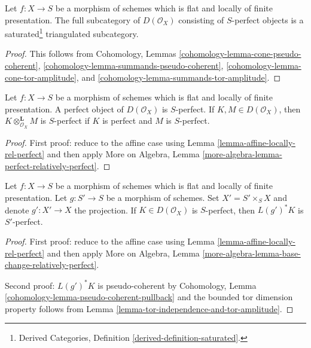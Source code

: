 \begin{lemma}
\label{lemma-triangulated}
Let $f : X \to S$ be a morphism of schemes which is
flat and locally of finite presentation. The full subcategory
of $D(\mathcal{O}_X)$ consisting of $S$-perfect objects is
a saturated\footnote{Derived Categories, Definition
\ref{derived-definition-saturated}.} triangulated subcategory.
\end{lemma}

\begin{proof}
This follows from Cohomology, Lemmas
\ref{cohomology-lemma-cone-pseudo-coherent},
\ref{cohomology-lemma-summands-pseudo-coherent},
\ref{cohomology-lemma-cone-tor-amplitude}, and
\ref{cohomology-lemma-summands-tor-amplitude}.
\end{proof}

\begin{lemma}
\label{lemma-perfect-relatively-perfect}
Let $f : X \to S$ be a morphism of schemes which is flat and locally
of finite presentation. A perfect object of $D(\mathcal{O}_X)$ is $S$-perfect.
If $K, M \in D(\mathcal{O}_X)$, then $K \otimes_{\mathcal{O}_X}^\mathbf{L} M$
is $S$-perfect if $K$ is perfect and $M$ is $S$-perfect.
\end{lemma}

\begin{proof}
First proof: reduce to the affine case using
Lemma \ref{lemma-affine-locally-rel-perfect}
and then apply More on Algebra, Lemma
\ref{more-algebra-lemma-perfect-relatively-perfect}.
\end{proof}

\begin{lemma}
\label{lemma-base-change-relatively-perfect}
Let $f : X \to S$ be a morphism of schemes which is flat and
locally of finite presentation.
Let $g : S' \to S$ be a morphism of schemes. Set $X' = S' \times_S X$
and denote $g' : X' \to X$ the projection.
If $K \in D(\mathcal{O}_X)$ is $S$-perfect, then $L(g')^*K$
is $S'$-perfect.
\end{lemma}

\begin{proof}
First proof: reduce to the affine case using
Lemma \ref{lemma-affine-locally-rel-perfect}
and then apply More on Algebra, Lemma
\ref{more-algebra-lemma-base-change-relatively-perfect}.

\medskip\noindent
Second proof: $L(g')^*K$ is pseudo-coherent by
Cohomology, Lemma \ref{cohomology-lemma-pseudo-coherent-pullback}
and the bounded tor dimension property follows from
Lemma \ref{lemma-tor-independence-and-tor-amplitude}.
\end{proof}

